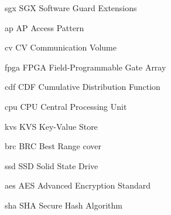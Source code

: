 \newacronym%
	{sgx}
	{SGX}
	{Software Guard Extensions}

\newacronym%
	{ap}
	{AP}
	{Access Pattern}

\newacronym%
	{cv}
	{CV}
	{Communication Volume}

\newacronym%
	{fpga}
	{FPGA}
	{Field-Programmable Gate Array}

\newacronym%
	{cdf}
	{CDF}
	{Cumulative Distribution Function}

\newacronym%
	{cpu}
	{CPU}
	{Central Processing Unit}

\newacronym%
	{kvs}
	{KVS}
	{Key-Value Store}

\newacronym%
	{brc}
	{BRC}
	{Best Range cover}

\newacronym%
	{ssd}
	{SSD}
	{Solid State Drive}

\newacronym%
	{aes}
	{AES}
	{Advanced Encryption Standard}

\newacronym%
	{sha}
	{SHA}
	{Secure Hash Algorithm}
